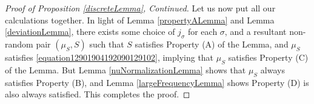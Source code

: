 \documentclass[12pt,reqno]{article}
\numberwithin{equation}{section}
\begin{document}
\begin{proof}[Proof of Proposition \ref{discreteLemma}, Continued]
    Let us now put all our calculations together. In light of Lemma \ref{propertyALemma} and Lemma \ref{deviationLemma}, there exists some choice of $j_\sigma$ for each $\sigma$, and a resultant non-random pair $(\mu_S, S)$ such that $S$ satisfies Property (A) of the Lemma, and $\mu_S$ satisfies \eqref{equation12901904192090129102}, implying that $\mu_S$ satisfies Property (C) of the Lemma. But Lemma \ref{nuNormalizationLemma} shows that $\mu_S$ always satisfies Property (B), and Lemma \eqref{largeFrequencyLemma} shows Property (D) is also always satisfied. This completes the proof.
    \begin{comment}

    Now
    \begin{align*}
        r_{m+1}^{d/2} \log(M_{m+1}) &= \left( l_{m+1}^{a\varepsilon - \frac{dn-s}{2n}} \cdot r_{m+1}^{d/2} \log(M_{m+1}) \right) l_{m+1}^{\frac{dn - s}{2n} - a \varepsilon}.
    \end{align*}
    Equation \eqref{equation5890129048128941891} implies
    \begin{align*}
        &l_{m+1}^{a\varepsilon - \frac{dn-s}{2n}} \cdot r_{m+1}^{d/2} \log(M_{m+1})\\
        &\ \ \ \ \ = \frac{l_m^{a\varepsilon - \frac{dn-s}{2n} + d/2} \log(M_{m+1}) K_{m+1}^{\frac{dn-s}{2n} - a\varepsilon}}{M_{m+1}^{a\varepsilon + \frac{s}{2n}}}\\
        &\ \ \ \ \ \leq \left[ l_m^{a\varepsilon - \frac{dn-s}{2n} + d/2} 2^{\frac{dn-s}{2n} - a \varepsilon} \right] \log(M_{m+1}) M_{m+1}^{\left( \frac{s}{dn-s} + c\varepsilon \right)\left(\frac{dn-s}{2n} - a\varepsilon\right) - a\varepsilon - \frac{s}{2n}}.
    \end{align*}
    Now
    \begin{align*}
        \left( \frac{s}{dn - s} + c\varepsilon \right) \left( \frac{dn - s}{2n} - a\varepsilon \right) - a\varepsilon &\leq \left[ \frac{(dn-s)c}{2n} - \left( \frac{s}{dn-s}+1 \right)a \right] \varepsilon\\
        &= \left[ \frac{d(3 - na)}{(dn - s)} \right] \varepsilon\\
        &\leq -2 \varepsilon.
    \end{align*}
    Since $\log(M_{m+1}) \leq (2/\varepsilon) M_{m+1}^{\varepsilon/2}$, if we assume that
    \begin{equation} \label{equation1290412904129049102}

\end{comment}
\end{proof}
\end{document}
